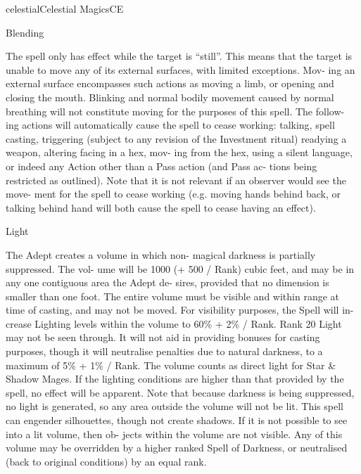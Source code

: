 \begin{College}[1.3]{celestial}{Celestial Magics}{CE}
\begin{spell}[G-1]{Blending }
\begin{effects}
The spell only has effect while the target is “still”. 
This means that the target is unable to move any of 
its external surfaces, with limited exceptions. Mov-
ing  an  external  surface  encompasses  such  actions 
as  moving  a  limb,  or  opening  and  closing  the 
mouth.  Blinking  and  normal  bodily  movement 
caused  by  normal  breathing  will  not  constitute 
moving  for  the  purposes  of  this  spell.  The  follow-
ing  actions  will  automatically  cause  the  spell  to 
cease  working:  talking,  spell  casting,  triggering 
(subject  to  any  revision  of  the  Investment  ritual) 
readying  a  weapon,  altering  facing  in  a  hex,  mov-
ing from the hex, using a silent language, or indeed 
any  Action  other  than  a  Pass  action  (and  Pass  ac-
tions  being  restricted  as  outlined).  Note  that  it  is 
not  relevant  if  an  observer  would  see  the  move-
ment  for  the  spell  to  cease  working  (e.g.  moving 
hands  behind  back,  or  talking  behind  hand  will 
both cause the spell to cease having an effect). 

\end{effects}
\end{spell}

\begin{spell}[G-2]{Light }

\begin{effects}
The Adept creates a volume in which non-
magical  darkness  is  partially  suppressed.  The  vol-
ume  will  be  1000  (+  500  /  Rank)  cubic  feet,  and 
may  be  in  any  one  contiguous  area  the  Adept  de-
sires,  provided  that  no  dimension  is  smaller  than 
one  foot.  The  entire  volume  must  be  visible  and 
within  range  at  time  of  casting,  and  may  not  be 
moved.  For  visibility  purposes,  the  Spell  will  in-
crease Lighting levels within the volume to 60\% + 
2\%  /  Rank.  Rank  20  Light  may  not  be  seen 
through.  It  will  not  aid  in  providing  bonuses  for 
casting purposes, though it will neutralise penalties 
due to natural darkness, to a maximum of 5\% + 1\% 
/  Rank.  The  volume  counts  as direct  light  for  Star 
\&  Shadow  Mages.  If  the  lighting  conditions  are 
higher  than  that  provided  by  the  spell,  no  effect 
will  be  apparent.  Note  that  because  darkness  is 
being suppressed, no light is generated, so any area 
outside  the  volume  will  not  be  lit.  This  spell  can 
engender silhouettes, though not create shadows. If 
it is not possible to see into a lit volume, then ob-
jects within the volume are not visible. Any of this 
volume  may  be  overridden  by  a  higher  ranked 
Spell  of  Darkness,  or  neutralised  (back  to  original 
conditions) by an equal rank. 


\end{effects}
\end{spell}
\end{College}
